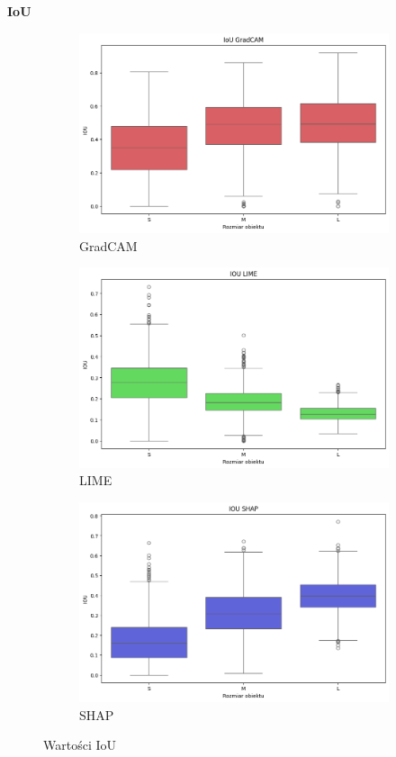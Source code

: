 \textbf{IoU}
\begin{figure}
	\centering
	\begin{subfigure}[b]{0.3\textwidth}
		\centering\includegraphics[width=.9\textwidth]{img/size_iou_gradcam}
		\caption{GradCAM}  \label{rys:size_iou_gradcam}
	\end{subfigure}
	\begin{subfigure}[b]{0.3\textwidth}
		\centering\includegraphics[width=.9\textwidth]{img/size_iou_lime}
		\caption{LIME}  \label{rys:size_iou_lime}
	\end{subfigure}
	\begin{subfigure}[b]{0.3\textwidth}
		\centering\includegraphics[width=.9\textwidth]{img/size_iou_shap}
		\caption{SHAP}  \label{rys:size_iou_shap}
	\end{subfigure}
	\caption{Wartości IoU}
\end{figure}


